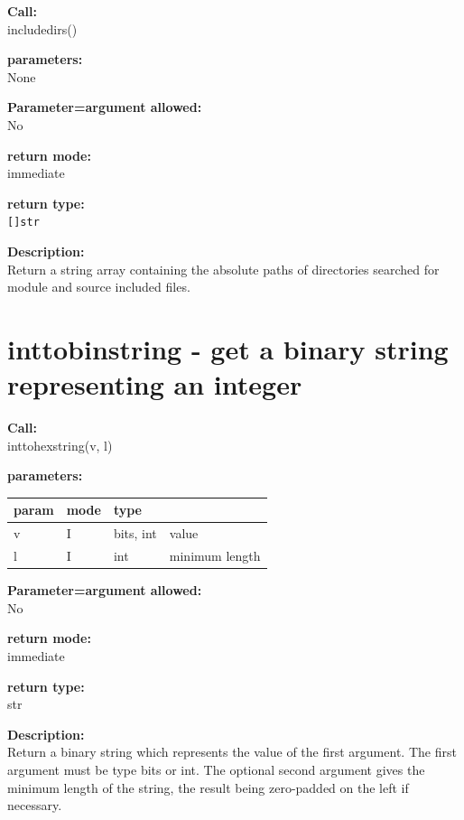         {\bf Call:} \\
        includedirs()
        
        {\bf parameters:} \\
        None
        
        {\bf Parameter=argument allowed:} \\
        No
        
        {\bf return mode:} \\
        immediate

        {\bf return type:} \\
        \verb'[]str'
        
        {\bf Description:} \\
        Return a string array containing the absolute paths of directories
        searched for module and source included files.





    \section{inttobinstring - get a binary string representing an integer}\label{sec:ifinttobinstring}
        
        {\bf Call:} \\
        inttohexstring(v, l)
        
        {\bf parameters:} \\
        \begin{tabular}{| l | l | l | l |}
        \hline
        param  & mode & type & \\
        \hline \hline
        v & I & bits, int & value           \\ \hline
        l & I & int       & minimum length  \\ \hline
        \end{tabular}
        
        {\bf Parameter=argument allowed:} \\
        No
        
        {\bf return mode:} \\
        immediate

        {\bf return type:} \\
        str
        
        {\bf Description:} \\
        Return a binary string which represents the value of the first
        argument. The first argument must be type bits or int. The optional
        second argument gives the minimum length of the string, the result being
        zero-padded on the left if necessary.





